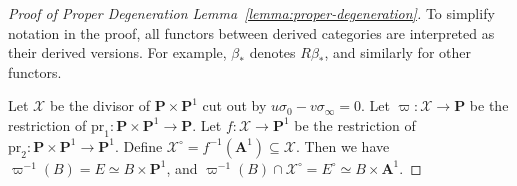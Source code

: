 \documentclass[english]{smfart}
\renewcommand{\mathbb}{\mathbf}
\renewcommand{\subset}{\subseteq}
\theoremstyle{remark}
\theoremstyle{plain}
\theoremstyle{definition}
\numberwithin{equation}{remark}
\theoremstyle{void}
\begin{document}
\begin{proof}[Proof of Proper Degeneration Lemma~\ref{lemma:proper-degeneration}]
To simplify notation in the proof, all functors between derived
categories are interpreted as their derived versions.  For example,
\(\beta_{\ast}\) denotes \(R\beta_{\ast}\), and similarly for other
functors.

Let \(\mathcal{X}\) be the divisor of \(\mathbb{P} \times \mathbb{P}^{1}\) cut
out by \(u\sigma_{0} - v\sigma_{\infty}=0\).  Let
\(\varpi\colon \mathcal{X} \to \mathbb{P}\) be the restriction of
\(\mathrm{pr}_{1}\colon \mathbb{P}\times \mathbb{P}^{1} \to \mathbb{P}\).  Let
\(f\colon \mathcal{X} \to \mathbb{P}^{1}\) be the restriction of
\(\mathrm{pr}_{2}\colon \mathbb{P} \times \mathbb{P}^{1} \to \mathbb{P}^{1}\).
Define \(\mathcal{X}^{\circ}=f^{-1}(\mathbb{A}^{1}) \subset \mathcal{X}\).
Then we have \(\varpi^{-1}(B) = E \simeq B \times \mathbb{P}^{1}\),
and \(\varpi^{-1}(B) \cap \mathcal{X}^{\circ} = E^{\circ} \simeq B \times \mathbb{A}^{1}\).


\end{proof}
\end{document}
